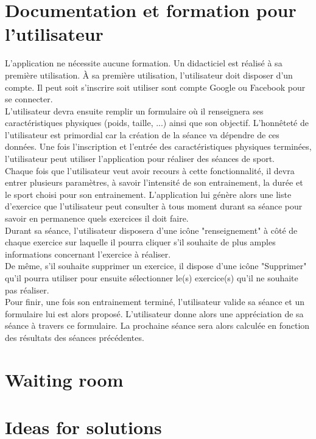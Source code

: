 \section{Documentation et formation pour l'utilisateur}

L'application ne nécessite aucune formation. Un didacticiel est réalisé à sa première utilisation. À sa première utilisation, l'utilisateur doit disposer d'un compte. Il peut soit s'inscrire soit utiliser sont compte Google ou Facebook pour se connecter.\\

L'utilisateur devra ensuite remplir un formulaire où il renseignera ses caractéristiques physiques (poids, taille, ...) ainsi que son objectif. L'honnêteté de l'utilisateur est primordial car la création de la séance va dépendre de ces données. Une fois l'inscription et l'entrée des caractéristiques physiques terminées, l'utilisateur peut utiliser l'application pour réaliser des séances de sport.\\

Chaque fois que l'utilisateur veut avoir recours à cette fonctionnalité, il devra entrer plusieurs paramètres, à savoir l'intensité de son entrainement, la durée et le sport choisi pour son entrainement. L'application lui génère alors une liste d'exercice que l'utilisateur peut  consulter à tous moment durant sa séance pour savoir en permanence quels exercices il doit faire.\\

Durant sa séance, l'utilisateur disposera d'une icône "renseignement" à côté de chaque exercice sur laquelle il pourra cliquer s'il souhaite de plus amples informations concernant l'exercice à réaliser.\\

De même, s'il souhaite supprimer un exercice, il dispose d'une icône "Supprimer" qu'il pourra utiliser pour ensuite sélectionner le(s) exercice(s) qu'il ne souhaite pas réaliser.\\

Pour finir, une fois son entrainement terminé, l'utilisateur valide sa séance et un formulaire lui est alors proposé. L'utilisateur donne alors une appréciation de sa séance à travers ce formulaire. La prochaine séance sera alors calculée en fonction des résultats des séances précédentes.

\section{Waiting room}

\section{Ideas for solutions}
